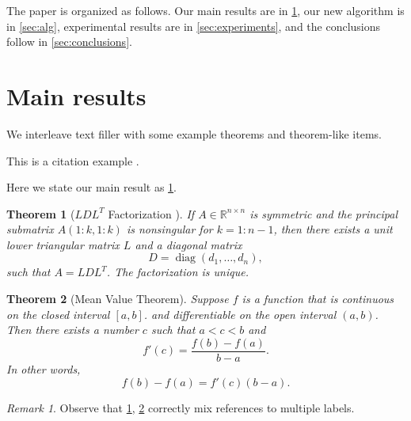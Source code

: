 \documentclass[10pt,reqno,final]{article}
\theoremstyle{plain}
\newtheorem{theorem}{Theorem}[section]
\theoremstyle{definition}
\theoremstyle{remark}
\newtheorem{remark}{Remark}[section]
\begin{document}
The paper is organized as follows. Our main results are in
\ref{sec:main}, our new algorithm is in \ref{sec:alg}, experimental
results are in \ref{sec:experiments}, and the conclusions follow in
\ref{sec:conclusions}.

\section{Main results}
\label{sec:main}


We interleave text filler with some example theorems and theorem-like
items.

\lipsum[5]

This is a citation example \cite{WoZhMeSh05}.

Here we state our main result as \ref{thm:bigthm}.

\begin{theorem}[$LDL^T$ Factorization \cite{GoVa13}]\label{thm:bigthm}
  If $A \in \mathbb{R}^{n \times n}$ is symmetric and the principal
  submatrix $A(1:k,1:k)$ is nonsingular for $k=1:n-1$, then there
  exists a unit lower triangular matrix $L$ and a diagonal matrix
  \begin{equation*}
    D = \operatorname{diag}(d_1,\dots,d_n),  %
  \end{equation*}
  such that $A=LDL^T$. The factorization is unique.
\end{theorem}

\lipsum[7]

\begin{theorem}[Mean Value Theorem]\label{thm:mvt}
  Suppose $f$ is a function that is continuous on the closed interval
  $[a,b]$.  and differentiable on the open interval $(a,b)$.
  Then there exists a number $c$ such that $a < c < b$ and
  \begin{equation*}
    f'(c) = \frac{f(b)-f(a)}{b-a}.
  \end{equation*}
  In other words,
  \begin{equation*}
    f(b)-f(a) = f'(c)(b-a).
  \end{equation*}
\end{theorem}

\begin{remark}
Observe that \ref{thm:bigthm}, \ref{thm:mvt} correctly mix references
to multiple labels.
\end{remark}
\end{document}
